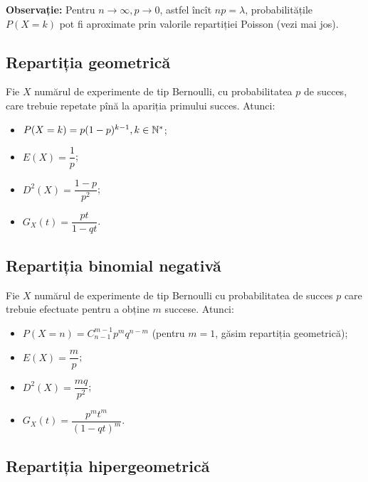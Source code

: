 \textbf{Observație:} Pentru $ n \to \infty, p \to 0 $, astfel încît $ np = \lambda $,
probabilitățile $ P(X = k) $ pot fi aproximate prin valorile repartiției Poisson
(vezi mai jos).


\subsection{Repartiția geometrică}

\indent\indent Fie $ X $ numărul de experimente de tip Bernoulli, cu probabilitatea $ p $
de succes, care trebuie repetate pînă la apariția primului succes. Atunci:
\begin{itemize}
\item $ P(X = k) = p(1 - p)^{k - 1}, k \in \mathbb{N}^\ast $;
\item $ E(X) = \dfrac{1}{p} $;
\item $ D^2(X) = \dfrac{1 - p}{p^2} $;
\item $ G_X(t) = \dfrac{pt}{1 - qt} $.
\end{itemize}


\subsection{Repartiția binomial negativă}

\indent\indent Fie $ X $ numărul de experimente de tip Bernoulli cu probabilitatea
de succes $ p $ care trebuie efectuate pentru a obține $ m $ succese. Atunci:
\begin{itemize}
\item $ P(X = n) = C_{n-1}^{m - 1} p^m q^{n-m} $ (pentru $ m = 1 $, găsim repartiția
  geometrică);
\item $ E(X) = \dfrac{m}{p} $;
\item $ D^2(X) = \dfrac{mq}{p^2} $;
\item $ G_X(t) = \dfrac{p^m t^m}{(1 - qt)^m} $.
\end{itemize}


\subsection{Repartiția hipergeometrică}


